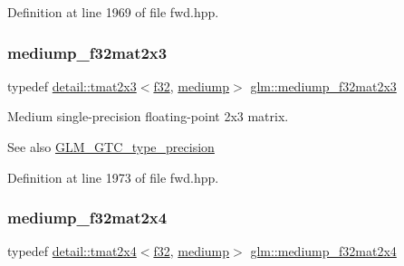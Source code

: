 Definition at line 1969 of file fwd.\+hpp.

\mbox{\label{group__gtc__type__precision_ga42497d19668931d225bccf1b9c614c19}} 
\subsubsection{\texorpdfstring{mediump\+\_\+f32mat2x3}{mediump\_f32mat2x3}}
{\footnotesize\ttfamily typedef \hyperlink{structglm_1_1detail_1_1tmat2x3}{detail\+::tmat2x3}$<$\hyperlink{group__gtc__type__precision_ga0ec999b57f5330d9021256e96038df04}{f32}, \hyperlink{namespaceglm_a0f04f086094c747d227af4425893f545a6416f3ea0c9025fb21ed50c4d6620482}{mediump}$>$ \hyperlink{group__gtc__type__precision_ga42497d19668931d225bccf1b9c614c19}{glm\+::mediump\+\_\+f32mat2x3}}

Medium single-\/precision floating-\/point 2x3 matrix. \begin{DoxySeeAlso}{See also}
\hyperlink{group__gtc__type__precision}{G\+L\+M\+\_\+\+G\+T\+C\+\_\+type\+\_\+precision} 
\end{DoxySeeAlso}


Definition at line 1973 of file fwd.\+hpp.

\mbox{\label{group__gtc__type__precision_ga20c5b3b715b70f1c09f7f95bfaa7aa84}} 
\subsubsection{\texorpdfstring{mediump\+\_\+f32mat2x4}{mediump\_f32mat2x4}}
{\footnotesize\ttfamily typedef \hyperlink{structglm_1_1detail_1_1tmat2x4}{detail\+::tmat2x4}$<$\hyperlink{group__gtc__type__precision_ga0ec999b57f5330d9021256e96038df04}{f32}, \hyperlink{namespaceglm_a0f04f086094c747d227af4425893f545a6416f3ea0c9025fb21ed50c4d6620482}{mediump}$>$ \hyperlink{group__gtc__type__precision_ga20c5b3b715b70f1c09f7f95bfaa7aa84}{glm\+::mediump\+\_\+f32mat2x4}}

